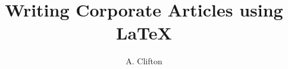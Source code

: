 \documentclass[twocolumn,a4paper,10pt,logo,tagged]{CorporateArticle}
\title{Writing Corporate Articles using LaTeX}
\author{A. Clifton}
\begin{document}

\tableofcontents
\listoffigures
\listoftables







\label{sec:TheBibliography}
\printbibliography

\appendix


\end{document}
